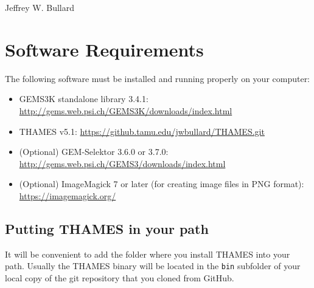 \documentclass{article}
\begin{document}

\begin{center}
	\Large{\textbf{}}
\end{center}
\begin{center}
	\large{Jeffrey W. Bullard}
\end{center}
\begin{center}
	\large{\DTMnow}
\end{center}

\dparspace
\tableofcontents

\dparspace

\section{\label{sec:requirements} Software Requirements}
The following software must be installed and running properly on your computer:
\begin{itemize}
	\item GEMS3K standalone library 3.4.1: \href{http://gems.web.psi.ch/GEMS3K/downloads/index.html}{http://gems.web.psi.ch/GEMS3K/downloads/index.html}
	\item THAMES v5.1: \href{https://github.tamu.edu/jwbullard/THAMES.git}{https://github.tamu.edu/jwbullard/THAMES.git}
	\item (Optional) GEM-Selektor 3.6.0 or 3.7.0: \href{http://gems.web.psi.ch/GEMS3/downloads/index.html}{http://gems.web.psi.ch/GEMS3/downloads/index.html}
	\item (Optional) ImageMagick 7 or later (for creating image files in PNG format): \href{https://imagemagick.org/}{https://imagemagick.org/}
\end{itemize}

\subsection{\label{sec:path} Putting THAMES in your path}
It will be convenient to add the folder where you install THAMES into your
path. Usually the THAMES binary will be located in the \texttt{bin} subfolder
of your local copy of the git repository that you cloned from GitHub.
\end{document}
